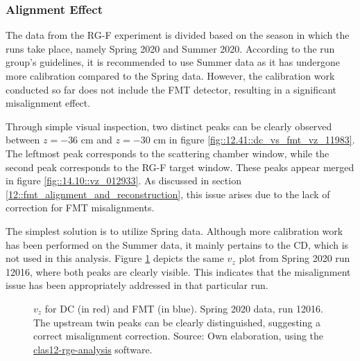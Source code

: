 \subsubsection{Alignment Effect}
\label{14.11::alignment_effect}
    The data from the RG-F experiment is divided based on the season in which the runs take place, namely Spring 2020 and Summer 2020.
    According to the run group's guidelines, it is recommended to use Summer data as it has undergone more calibration compared to the Spring data.
    However, the calibration work conducted so far does not include the FMT detector, resulting in a significant misalignment effect.

    Through simple visual inspection, two distinct peaks can be clearly observed between $z = -36$ cm and $z = -30$ cm in figure \ref{fig::12.41::dc_vs_fmt_vz_11983}.
    The leftmost peak corresponds to the scattering chamber window, while the second peak corresponds to the RG-F target window.
    These peaks appear merged in figure \ref{fig::14.10::vz_012933}.
    As discussed in section \ref{12::fmt_alignment_and_reconstruction}, this issue arises due to the lack of correction for FMT misalignments.

    The simplest solution is to utilize Spring data.
    Although more calibration work has been performed on the Summer data, it mainly pertains to the CD, which is not used in this analysis.
    Figure \ref{fig::14.11::vz_012016} depicts the same $v_z$ plot from Spring 2020 run 12016, where both peaks are clearly visible.
    This indicates that the misalignment issue has been appropriately addressed in that particular run.

    \begin{figure}[t!]
        \centering{}
        \caption[$v_z$ for DC and FMT, run 12016]{$v_z$ for DC (in red) and FMT (in blue).
        Spring 2020 data, run 12016. The upstream twin peaks can be clearly distinguished, suggesting a correct misalignment correction.
        Source: Own elaboration, using the \hyperlink{github.com/bleaktwig/clas12-rge-analysis}{clas12-rge-analysis} software.}
        \label{fig::14.11::vz_012016}
    \end{figure}
